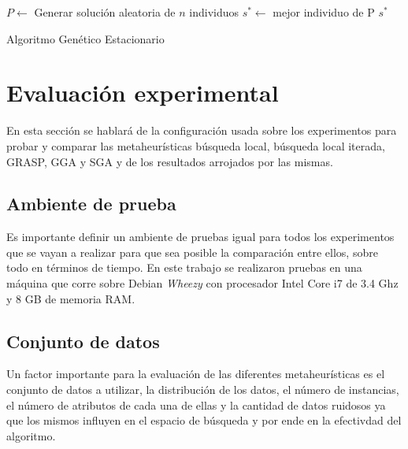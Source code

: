 \documentclass{ci5652}
\begin{document}
\begin{algorithm}[!h]
    \DontPrintSemicolon
    \vspace*{0.1cm}

	$P \leftarrow $ Generar solución aleatoria de $n$ individuos\;
	$s^{*} \leftarrow $ mejor individuo de P\;
	\Return $s^{*}$    
    \vspace*{0.1cm}
    \caption{Algoritmo Genético Estacionario}
    \label{alg:sga}
\end{algorithm}
\section{Evaluación experimental}
En esta sección se hablará de la configuración usada sobre los experimentos para probar y comparar las metaheurísticas búsqueda local, búsqueda local iterada, GRASP, GGA y SGA y de los resultados arrojados por las mismas.

\subsection{Ambiente de prueba}
Es importante definir un ambiente de pruebas igual para todos los experimentos que se vayan a realizar para que sea posible la comparación entre ellos, sobre todo en términos de tiempo. En este trabajo se realizaron pruebas en una máquina que corre sobre Debian \textit{Wheezy} con procesador Intel Core i7 de 3.4 Ghz y 8 GB de memoria RAM. 
\subsection{Conjunto de datos}
	
Un factor importante para la evaluación de las diferentes metaheurísticas es el conjunto de datos a utilizar, la distribución de los datos, el número de instancias, el número de atributos de cada una de ellas y la cantidad de datos ruidosos ya que los mismos influyen en el espacio de búsqueda y por ende en la efectivdad del algoritmo. 
\end{document}
